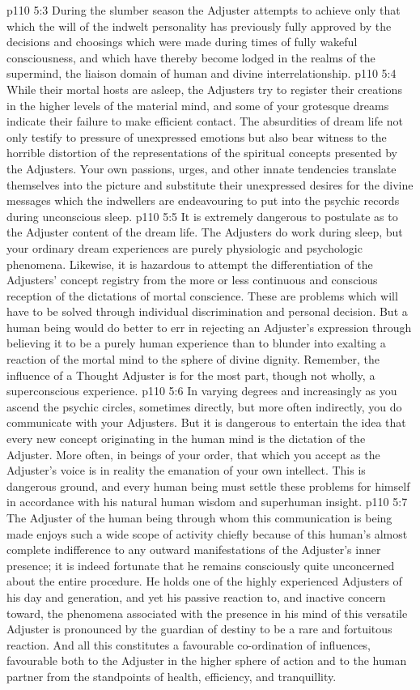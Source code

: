 \vs p110 5:3 During the slumber season the Adjuster attempts to achieve only that which the will of the indwelt personality has previously fully approved by the decisions and choosings which were made during times of fully wakeful consciousness, and which have thereby become lodged in the realms of the supermind, the liaison domain of human and divine interrelationship.
\vs p110 5:4 While their mortal hosts are asleep, the Adjusters try to register their creations in the higher levels of the material mind, and some of your grotesque dreams indicate their failure to make efficient contact. The absurdities of dream life not only testify to pressure of unexpressed emotions but also bear witness to the horrible distortion of the representations of the spiritual concepts presented by the Adjusters. Your own passions, urges, and other innate tendencies translate themselves into the picture and substitute their unexpressed desires for the divine messages which the indwellers are endeavouring to put into the psychic records during unconscious sleep.
\vs p110 5:5 It is extremely dangerous to postulate as to the Adjuster content of the dream life. The Adjusters do work during sleep, but your ordinary dream experiences are purely physiologic and psychologic phenomena. Likewise, it is hazardous to attempt the differentiation of the Adjusters’ concept registry from the more or less continuous and conscious reception of the dictations of mortal conscience. These are problems which will have to be solved through individual discrimination and personal decision. But a human being would do better to err in rejecting an Adjuster’s expression through believing it to be a purely human experience than to blunder into exalting a reaction of the mortal mind to the sphere of divine dignity. Remember, the influence of a Thought Adjuster is for the most part, though not wholly, a superconscious experience.
\vs p110 5:6 In varying degrees and increasingly as you ascend the psychic circles, sometimes directly, but more often indirectly, you do communicate with your Adjusters. But it is dangerous to entertain the idea that every new concept originating in the human mind is the dictation of the Adjuster. More often, in beings of your order, that which you accept as the Adjuster’s voice is in reality the emanation of your own intellect. This is dangerous ground, and every human being must settle these problems for himself in accordance with his natural human wisdom and superhuman insight.
\vs p110 5:7 \pc The Adjuster of the human being through whom this communication is being made enjoys such a wide scope of activity chiefly because of this human’s almost complete indifference to any outward manifestations of the Adjuster’s inner presence; it is indeed fortunate that he remains consciously quite unconcerned about the entire procedure. He holds one of the highly experienced Adjusters of his day and generation, and yet his passive reaction to, and inactive concern toward, the phenomena associated with the presence in his mind of this versatile Adjuster is pronounced by the guardian of destiny to be a rare and fortuitous reaction. And all this constitutes a favourable co\hyp{}ordination of influences, favourable both to the Adjuster in the higher sphere of action and to the human partner from the standpoints of health, efficiency, and tranquillity.
